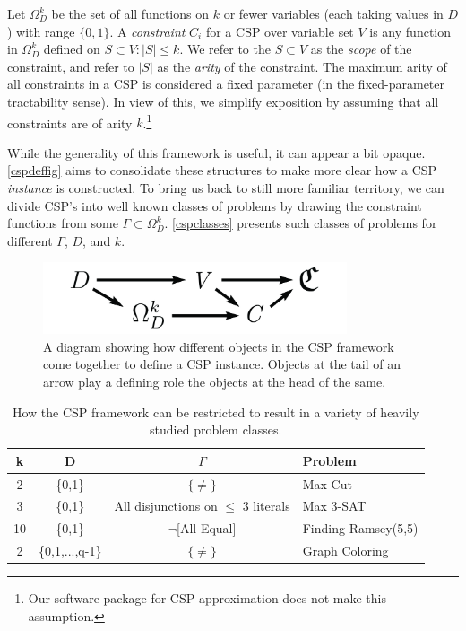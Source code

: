 \documentclass[12pt]{article} %
\begin{document}
Let $\Omega_D^k$ be the set of all functions on $k$ or fewer variables (each taking values in $D$) with range $\{ 0,1 \}$. A \textit{constraint} $C_i$ for a CSP over variable set $V$ is any function in $\Omega_D^k$ defined on $S \subset V : |S| \leq k$. We refer to the $S \subset V$ as the \textit{scope} of the constraint, and refer to $|S|$ as the \textit{arity} of the constraint. The maximum arity of all constraints in a CSP is considered a fixed parameter (in the fixed-parameter tractability sense). In view of this, we simplify exposition by assuming that all constraints are of arity $k$.\footnote{Our software package for CSP approximation does not make this assumption.}

While the generality of this framework is useful, it can appear a bit opaque. \autoref{cspdeffig} aims to consolidate these structures to make more clear how a CSP \textit{instance} is constructed. To bring us back to still more familiar territory, we can divide CSP's into well known classes of problems by drawing the constraint functions from some $\Gamma \subset \Omega_D^k$. \autoref{cspclasses} presents such classes of problems for different $\Gamma$, $D$, and $k$.

\begin{figure}[htb]
\begin{center}
\includegraphics[width=0.8\textwidth]{images/cspdefsec_thinner}
\caption{A diagram showing how different objects in the CSP framework come together to define a CSP instance. Objects at the tail of an arrow play a defining role the objects at the head of the same.}
\label{cspdeffig}
\end{center}
\end{figure}

\begin{table}[htb]
\begin{center}
\begin{tabular}{c c c l}
\hline
k & D & $\Gamma$ & Problem \\
\hline
2  & \{0,1\} & $\{\neq\}$ & Max-Cut \\
3  & \{0,1\} & All disjunctions on $\leq $ 3 literals & Max 3-SAT \\
10 & \{0,1\} & $\neg$[All-Equal] & Finding Ramsey(5,5) \\
2  & \{0,1,...,q-1\} & $\{\neq\}$ & Graph Coloring \\
\hline
\end{tabular}
\caption{How the CSP framework can be restricted to result in a variety of heavily studied problem classes.}
\label{cspclasses}
\end{center}
\end{table}
\end{document}
